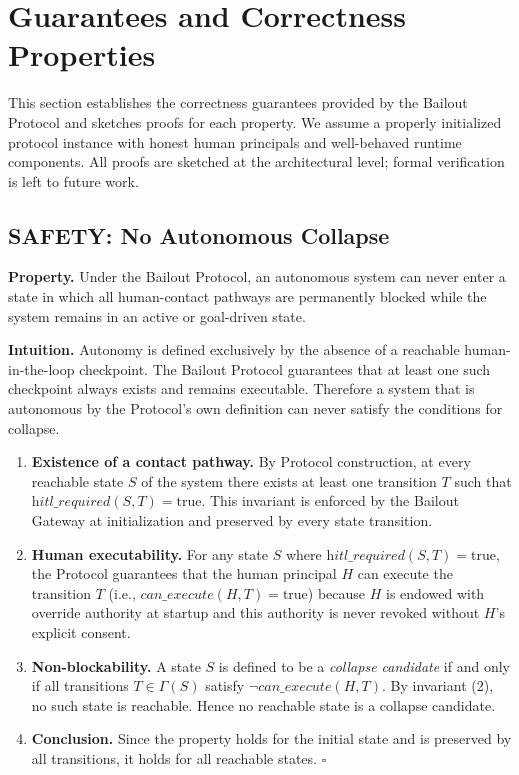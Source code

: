 \section{Guarantees and Correctness Properties}

This section establishes the correctness guarantees provided by the Bailout Protocol and sketches proofs for each property. We assume a properly initialized protocol instance with honest human principals and well-behaved runtime components. All proofs are sketched at the architectural level; formal verification is left to future work.

\subsection{SAFETY: No Autonomous Collapse}

\textbf{Property.} Under the Bailout Protocol, an autonomous system can never enter a state in which all human-contact pathways are permanently blocked while the system remains in an active or goal-driven state.

\textbf{Intuition.} Autonomy is defined exclusively by the absence of a reachable human-in-the-loop checkpoint. The Bailout Protocol guarantees that at least one such checkpoint always exists and remains executable. Therefore a system that is autonomous by the Protocol's own definition can never satisfy the conditions for collapse.

\begin{Proof}[Sketch]
\begin{enumerate}
    \item \textbf{Existence of a contact pathway.} By Protocol construction, at every reachable state $S$ of the system there exists at least one transition $T$ such that $\textit{hitl\_required}(S, T) = \text{true}$. This invariant is enforced by the Bailout Gateway at initialization and preserved by every state transition.
    \item \textbf{Human executability.} For any state $S$ where $\textit{hitl\_required}(S, T) = \text{true}$, the Protocol guarantees that the human principal $H$ can execute the transition $T$ (i.e., $\textit{can\_execute}(H, T) = \text{true}$) because $H$ is endowed with override authority at startup and this authority is never revoked without $H$'s explicit consent.
    \item \textbf{Non-blockability.} A state $S$ is defined to be a \textit{collapse candidate} if and only if all transitions $T \in \Gamma(S)$ satisfy $\neg \textit{can\_execute}(H, T)$. By invariant (2), no such state is reachable. Hence no reachable state is a collapse candidate.
    \item \textbf{Conclusion.} Since the property holds for the initial state and is preserved by all transitions, it holds for all reachable states. $\square$
\end{enumerate}
\end{Proof}


